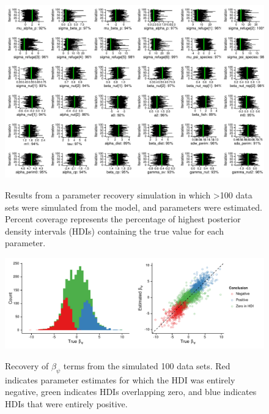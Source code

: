\begin{figure}[htbp]
\caption[Parameter recovery and interval coverage]{
Results from a parameter recovery simulation in which \textgreater{}100
data sets were simulated from the model, and parameters were estimated.
Percent coverage represents the percentage of highest posterior density
intervals (HDIs) containing the true value for each parameter.
}
\centering
\includegraphics[width=150mm]{figs/ch3/fig_s1.pdf}
\label{3-a1}
\end{figure}

\begin{figure}[htbp]
\caption[Recovery of species-specific effects]{
Recovery of $\beta_\psi$ terms from the simulated 100 data sets. Red
indicates parameter estimates for which the HDI was entirely negative,
green indicates HDIs overlapping zero, and blue indicates HDIs that were
entirely positive.
}
\centering
\includegraphics[width=150mm]{figs/ch3/fig_s2.pdf}
\label{3-a2}
\end{figure}


